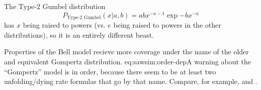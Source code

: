 The Type-2 Gumbel distribution\citet{wikipedia:gumbel-t2}
\begin{equation}
  P_\text{Type-2 Gumbel}(x|a,b) = abx^{-a-1}\exp{-bx^{-a}}
\end{equation}
has $x$ being raised to powers (vs. $e$ being raised to powers in the
other distributions), so it is an entirely different beast.

Properties of the Bell model recieve more coverage under the name of
the older and equivalent Gompertz
distribution\citep{gompertz25,olshansky97,wu04}.  eq:sawsim:order-depA
warning about the ``Gompertz'' model is in order, because there seem
to be at least two unfolding/dying rate formulas that go by that name.
Compare, for example,  and
.
